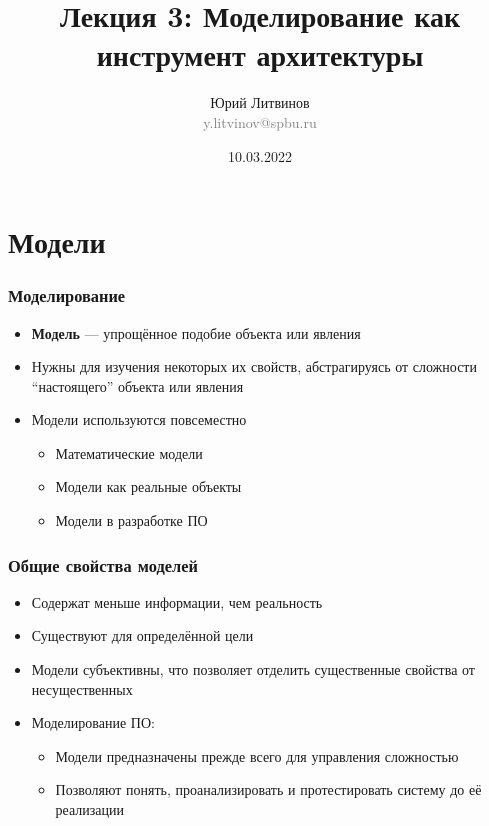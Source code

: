 \documentclass[xetex,mathserif,serif]{beamer}
\title[Моделирование]{Лекция 3: Моделирование как инструмент архитектуры}
\author[Юрий Литвинов]{Юрий Литвинов\\\small{\textcolor{gray}{y.litvinov@spbu.ru}}}
\date{10.03.2022}
\begin{document}
    \frame{\titlepage}

    \section{Модели}

    \begin{frame}
        \frametitle{Моделирование}
        \begin{itemize}
            \item \textbf{Модель} --- упрощённое подобие объекта или явления
            \item Нужны для изучения некоторых их свойств, абстрагируясь от сложности ``настоящего'' объекта или явления
            \item Модели используются повсеместно
            \begin{itemize}
                \item Математические модели
                \item Модели как реальные объекты
                \item Модели в разработке ПО
            \end{itemize}
        \end{itemize}
    \end{frame}

    \begin{frame}
        \frametitle{Общие свойства моделей}
        \begin{itemize}
            \item Содержат меньше информации, чем реальность
            \item Существуют для определённой цели
            \item Модели субъективны, что позволяет отделить существенные свойства от несущественных
            \item Моделирование ПО:
            \begin{itemize}
                \item Модели предназначены прежде всего для управления сложностью
                \item Позволяют понять, проанализировать и протестировать систему до её реализации
            \end{itemize}
        \end{itemize}

    \end{frame}
\end{document}
